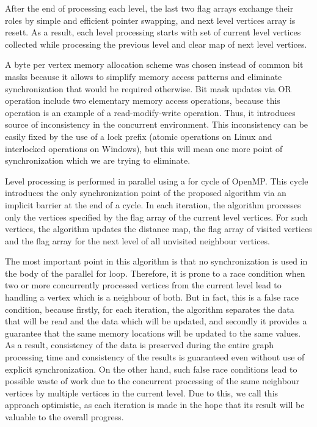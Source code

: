 \documentclass[letterpaper]{article}
\begin{document}
			After the end of processing each level, the last two flag arrays exchange their roles by simple and efficient pointer swapping, and next level vertices array is resett.
			As a result, each level processing starts with set of current level vertices collected while processing the previous level and clear map of next level vertices. 

			A byte per vertex memory allocation scheme was chosen instead of common bit masks because it allows to simplify memory access patterns and eliminate synchronization that would be required otherwise.
			Bit mask updates via OR operation include two elementary memory access operations, because this operation is an example of a read-modify-write operation.
			Thus, it introduces source of inconsistency in the concurrent environment.
			This inconsistency can be easily fixed by the use of a lock prefix (atomic operations on Linux and interlocked operations on Windows), but this will mean one more point of synchronization which we are trying to eliminate.
			
			Level processing is performed in parallel using a for cycle of OpenMP.
			This cycle introduces the only synchronization point of the proposed algorithm via an implicit barrier at the end of a cycle.
			In each iteration, the algorithm processes only the vertices specified by the flag array of the current level vertices.
			For such vertices, the algorithm updates the distance map, the flag array of visited vertices and the flag array for the next level of all unvisited neighbour vertices.
			
			The most important point in this algorithm is that no synchronization is used in the body of the parallel for loop.
			Therefore, it is prone to a race condition when two or more concurrently processed vertices from the current level lead to handling a vertex which is a neighbour of both.
			But in fact, this is a false race condition, because firstly, for each iteration, the algorithm separates the data that will be read and the data which will be updated, and secondly it provides a guarantee that the same memory locations will be updated to the same values.
			As a result, consistency of the data is preserved during the entire graph processing time and consistency of the results is guaranteed even without use of explicit synchronization.
			On the other hand, such false race conditions lead to possible waste of work due to the concurrent processing of the same neighbour vertices by multiple vertices in the current level.
			Due to this, we call this approach optimistic, as each iteration is made in the hope that its result will be valuable to the overall progress.  
			
\end{document}
